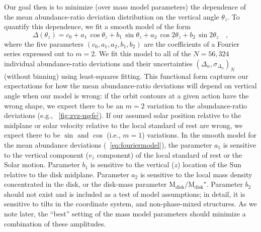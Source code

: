 \documentclass[modern]{aastex63}
\newcommand{\nstars}{56,324}
\newcommand{\mdisk}{\ensuremath{\mathrm{M}_\mathrm{disk}}}
\newcommand{\mratio}{\ensuremath{\mdisk / \mdisk^\star}}
\begin{document}
Our goal then is to minimize (over mass model parameters) the dependence of the
mean abundance-ratio deviation distribution on the vertical angle $\theta_z$.
To quantify this dependence, we fit a smooth model of the form
\begin{equation}
  \Delta(\theta_z) = c_0 + a_1\,\cos  \theta_z + b_1\,\sin    \theta_z
                         + a_2\,\cos 2\theta_z + b_2\,\sin 2\theta_z \quad,
                         \label{eq:fouriermodel}
\end{equation}
where the five parameters $(c_0, a_1, a_2, b_1, b_2)$ are the coefficients of a
Fourier series expressed out to $m=2$.
We fit this model to all of the $N=\nstars$ individual abundance-ratio
deviations and their uncertainties $(\Delta_n, \sigma_{\Delta_n})_N$ (without
binning) using least-squares fitting. %
This functional form captures our expectations for how the mean abundance-ratio
deviations will depend on vertical angle when our model is wrong:
if the orbit contours at a given action have the wrong shape, we expect there to
be an $m=2$ variation to the abundance-ratio deviations (e.g.,
\figurename~\ref{fig:zvz-mgfe}).
If our assumed solar position relative to the midplane or solar velocity
relative to the local standard of rest are wrong, we expect there to be $\sin$
and $\cos$ (i.e., $m=1$) variations.
In the smooth model for the mean abundance deviations
(\equationname~\ref{eq:fouriermodel}), the parameter $a_1$ is sensitive to the
vertical component ($v_z$ component) of the local standard of rest or the Solar
motion.
Parameter $b_1$ is sensitive to the vertical ($z$) location of the Sun relative
to the disk midplane.
Parameter $a_2$ is sensitive to the local mass density concentrated in the disk,
or the disk-mass parameter \mratio.
Parameter $b_2$ should not exist and is included as a test of model assumptions;
in detail, it is sensitive to tilts in the coordinate system, and
non-phase-mixed structures.
As we note later, the ``best'' setting of the mass model parameters should
minimize a combination of these amplitudes.
\end{document}
